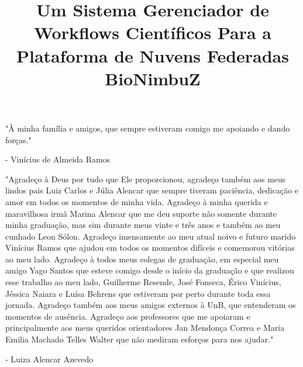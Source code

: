\documentclass[bacharelado]{unb-cic}
\title{Um Sistema Gerenciador de Workflows Científicos Para a Plataforma de Nuvens Federadas BioNimbuZ}
\begin{document}
  \maketitle
  \pretextual

  \begin{dedicatoria}
  	  	\begin{center}
  		"À minha família e amigos, que sempre estiveram comigo me apoiando e dando forças."
  		
  	- Vinícius de Almeida Ramos
  	\end{center}
  	
  \end{dedicatoria}

  \begin{agradecimentos}
   	
   	\begin{center}
   		"Agradeço à Deus por tudo que Ele proporcionou, agradeço também aos meus lindos pais Luiz Carlos e Júlia Alencar que sempre tiveram paciência, dedicação e amor em todos os momentos de minha vida. Agradeço à minha querida e maravilhosa irmã Marina Alencar que me deu suporte não somente durante minha graduação, mas sim durante meus vinte e três anos e também ao meu cunhado Leon Sólon. Agradeço imensamente ao meu atual noivo e futuro marido Vinícius Ramos que ajudou em todos os momentos difíceis e comemorou vitórias ao meu lado. 
   		\newline
   		Agradeço à todos meus colegas de graduação, em especial meu amigo Yago Santos que esteve comigo desde o início da graduação e que realizou esse trabalho ao meu lado, Guilherme Resende, José Fonseca, Érico Vinícius, Jéssica Naiara e Luísa Behrens que estiveram por perto durante toda essa jornada. Agradeço também aos meus amigos externos à UnB, que entenderam os momentos de ausência.
   		\newline
   		Agradeço aos professores que me apoiaram e principalmente aos meus queridos orientadores Jan Mendonça Correa e Maria Emilia Machado Telles Walter que não mediram esforços para nos ajudar."
   		
   		- Luiza Alencar Azevedo
   	\end{center}   
   	
  \end{agradecimentos}
\end{document}

